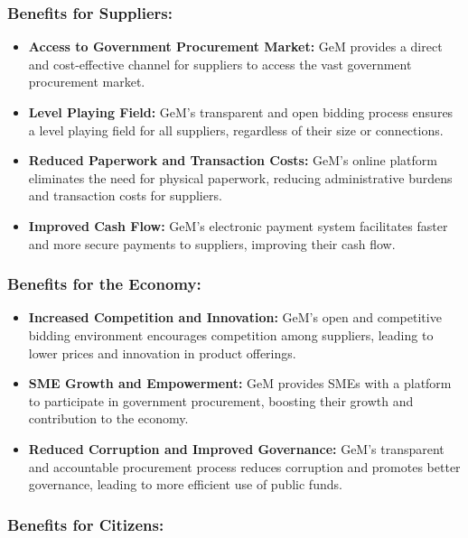 \subsubsection{Benefits for Suppliers:}

\begin{itemize}
    \item \textbf{Access to Government Procurement Market:} GeM provides a direct and cost-effective channel for suppliers to access the vast government procurement market.
    
    \item \textbf{Level Playing Field:} GeM's transparent and open bidding process ensures a level playing field for all suppliers, regardless of their size or connections.
    
    \item \textbf{Reduced Paperwork and Transaction Costs:} GeM's online platform eliminates the need for physical paperwork, reducing administrative burdens and transaction costs for suppliers.
    
    \item \textbf{Improved Cash Flow:} GeM's electronic payment system facilitates faster and more secure payments to suppliers, improving their cash flow.
\end{itemize}

\subsubsection{Benefits for the Economy:}

\begin{itemize}
    \item \textbf{Increased Competition and Innovation:} GeM's open and competitive bidding environment encourages competition among suppliers, leading to lower prices and innovation in product offerings.
    
    \item \textbf{SME Growth and Empowerment:} GeM provides SMEs with a platform to participate in government procurement, boosting their growth and contribution to the economy.
    
    \item \textbf{Reduced Corruption and Improved Governance:} GeM's transparent and accountable procurement process reduces corruption and promotes better governance, leading to more efficient use of public funds.
\end{itemize}

\subsubsection{Benefits for Citizens:}

